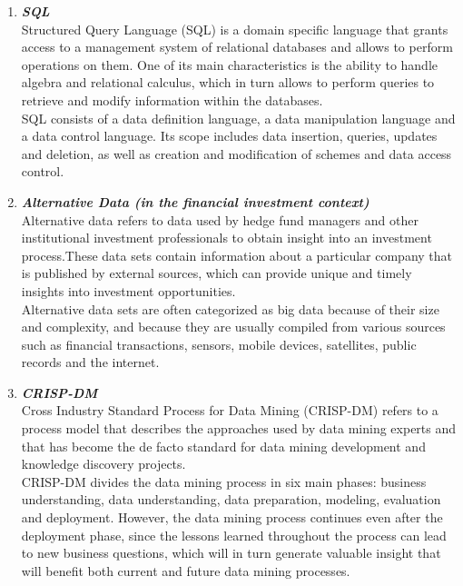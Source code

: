 \documentclass{article}
\begin{document}
\begin{enumerate}[label=(\alph*)]
\begin{enumerate}[label=\textbf{\arabic*.}]
            \item \textbf{\textit{SQL}}\\
Structured Query Language (SQL) is a domain specific language that grants access to a management system of relational databases and allows to perform operations on them. One of its main characteristics is the ability to handle algebra and relational calculus, which in turn allows to perform queries to retrieve and modify information within the databases.\\
SQL consists of a data definition language, a data manipulation language and a data control language. Its scope includes data insertion, queries, updates and deletion, as well as creation and modification of schemes and data access control.
            
            \item \textbf{\textit{Alternative Data (in the financial investment context)}}\\
Alternative data refers to data used by hedge fund managers and other institutional investment professionals to obtain insight into an investment process.These data sets contain information about a particular company that is published by external sources, which can provide unique and timely insights into investment opportunities.\\
Alternative data sets are often categorized as big data because of their size and complexity, and because they are usually compiled from various sources such as financial transactions, sensors, mobile devices, satellites, public records and the internet.
            
            \item \textbf{\textit{CRISP-DM}}\\
Cross Industry Standard Process for Data Mining (CRISP-DM) refers to a process model that describes the approaches used by data mining experts and that has become the de facto standard for data mining development and knowledge discovery projects.\\
CRISP-DM divides the data mining process in six main phases: business understanding, data understanding, data preparation, modeling, evaluation and deployment. However, the data mining process continues even after the deployment phase, since the lessons learned throughout the process can lead to new business questions, which will in turn generate valuable insight that will benefit both current and future data mining processes. 
        \end{enumerate}
    \end{enumerate}
    
\end{document}
